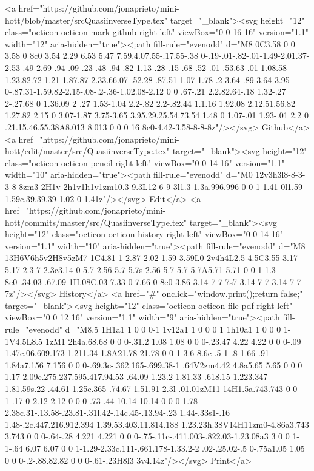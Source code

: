       <a href="https://github.com/jonaprieto/mini-hott/blob/master/srcQuasiinverseType.tex" target="_blank"><svg height="12" class="octicon octicon-mark-github right left" viewBox="0 0 16 16" version="1.1" width="12" aria-hidden="true"><path fill-rule="evenodd" d="M8 0C3.58 0 0 3.58 0 8c0 3.54 2.29 6.53 5.47 7.59.4.07.55-.17.55-.38 0-.19-.01-.82-.01-1.49-2.01.37-2.53-.49-2.69-.94-.09-.23-.48-.94-.82-1.13-.28-.15-.68-.52-.01-.53.63-.01 1.08.58 1.23.82.72 1.21 1.87.87 2.33.66.07-.52.28-.87.51-1.07-1.78-.2-3.64-.89-3.64-3.95 0-.87.31-1.59.82-2.15-.08-.2-.36-1.02.08-2.12 0 0 .67-.21 2.2.82.64-.18 1.32-.27 2-.27.68 0 1.36.09 2 .27 1.53-1.04 2.2-.82 2.2-.82.44 1.1.16 1.92.08 2.12.51.56.82 1.27.82 2.15 0 3.07-1.87 3.75-3.65 3.95.29.25.54.73.54 1.48 0 1.07-.01 1.93-.01 2.2 0 .21.15.46.55.38A8.013 8.013 0 0 0 16 8c0-4.42-3.58-8-8-8z"/></svg> Github</a>
      <a href="https://github.com/jonaprieto/mini-hott/edit/master/src/QuasiinverseType.tex" target="_blank"><svg height="12" class="octicon octicon-pencil right left" viewBox="0 0 14 16" version="1.1" width="10" aria-hidden="true"><path fill-rule="evenodd" d="M0 12v3h3l8-8-3-3-8 8zm3 2H1v-2h1v1h1v1zm10.3-9.3L12 6 9 3l1.3-1.3a.996.996 0 0 1 1.41 0l1.59 1.59c.39.39.39 1.02 0 1.41z"/></svg> Edit</a>
      <a href="https://github.com/jonaprieto/mini-hott/commits/master/src/QuasiinverseType.tex" target="_blank"><svg height="12" class="octicon octicon-history right left" viewBox="0 0 14 16" version="1.1" width="10" aria-hidden="true"><path fill-rule="evenodd" d="M8 13H6V6h5v2H8v5zM7 1C4.81 1 2.87 2.02 1.59 3.59L0 2v4h4L2.5 4.5C3.55 3.17 5.17 2.3 7 2.3c3.14 0 5.7 2.56 5.7 5.7s-2.56 5.7-5.7 5.7A5.71 5.71 0 0 1 1.3 8c0-.34.03-.67.09-1H.08C.03 7.33 0 7.66 0 8c0 3.86 3.14 7 7 7s7-3.14 7-7-3.14-7-7-7z"/></svg> History</a>
      <a  href="#" onclick="window.print();return false;" target="_blank"><svg height="12" class="octicon octicon-file-pdf right left" viewBox="0 0 12 16" version="1.1" width="9" aria-hidden="true"><path fill-rule="evenodd" d="M8.5 1H1a1 1 0 0 0-1 1v12a1 1 0 0 0 1 1h10a1 1 0 0 0 1-1V4.5L8.5 1zM1 2h4a.68.68 0 0 0-.31.2 1.08 1.08 0 0 0-.23.47 4.22 4.22 0 0 0-.09 1.47c.06.609.173 1.211.34 1.8A21.78 21.78 0 0 1 3.6 8.6c-.5 1-.8 1.66-.91 1.84a7.156 7.156 0 0 0-.69.3c-.362.165-.699.38-1 .64V2zm4.42 4.8a5.65 5.65 0 0 0 1.17 2.09c.275.237.595.417.94.53-.64.09-1.23.2-1.81.33-.618.15-1.223.347-1.81.59s.22-.44.61-1.25c.365-.74.67-1.51.91-2.3l-.01.01zM11 14H1.5a.743.743 0 0 1-.17 0 2.12 2.12 0 0 0 .73-.44 10.14 10.14 0 0 0 1.78-2.38c.31-.13.58-.23.81-.31l.42-.14c.45-.13.94-.23 1.44-.33s1-.16 1.48-.2c.447.216.912.394 1.39.53.403.11.814.188 1.23.23h.38V14H11zm0-4.86a3.743 3.743 0 0 0-.64-.28 4.221 4.221 0 0 0-.75-.11c-.411.003-.822.03-1.23.08a3 3 0 0 1-1-.64 6.07 6.07 0 0 1-1.29-2.33c.111-.661.178-1.33.2-2 .02-.25.02-.5 0-.75a1.05 1.05 0 0 0-.2-.88.82.82 0 0 0-.61-.23H8l3 3v4.14z"/></svg> Print</a>
